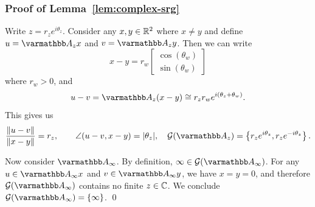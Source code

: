 \documentclass[10pt,mathserif]{beamer}
\begin{document}
\begin{frame}
\frametitle{Proof of Lemma~\ref{lem:complex-srg}}
Write $z=r_ze^{i\theta_{z}}$.
Consider any $x,y\in \mathbb{R}^2$ where $x\ne y$ and define $u=\opA_zx$ and $v=\opA_zy$.
Then we can write
\[
x-y=r_w
\begin{bmatrix}
\cos(\theta_w)\\
\sin(\theta_w)
\end{bmatrix}
\]
where $r_w>0$, and
\[
u-v=\opA_z(x-y)\cong r_{z}r_we^{i(\theta_{z}+\theta_w)}.
\]
This gives us
\[
\frac{\|u-v\|}{\|x-y\|}= r_z,\quad
\quad
\angle (u-v,x-y)=|\theta_z|,
\quad
\cG(\opA_z)=\left\{r_{z}e^{i\theta_{z}},r_{z}e^{- i\theta_{z}}\right\}.
\]
\vspace{0.2in}

Now consider $\opA_\infty$.
By definition, $\infty\in \cG(\opA_\infty)$.
For any $u\in \opA_\infty x$ and $v\in \opA_\infty y$, we have $x=y=0$,
and therefore $\cG(\opA_\infty)$ contains no finite $z\in \mathbb{C}$.
We conclude $\cG(\opA_\infty)=\{\infty\}$.
\qed
\end{frame}
\end{document}
